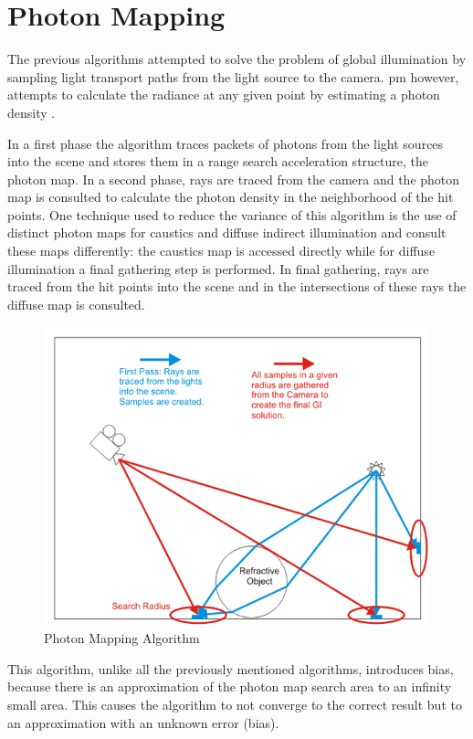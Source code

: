 \section{Photon Mapping}

The previous algorithms attempted to solve the problem of global illumination by sampling light transport paths from the light source to the camera. \gls{pm} however, attempts to calculate the radiance at any given point by estimating a photon density \citep{Jensen}.

In a first phase the algorithm traces packets of photons from the light sources into the scene and stores them in a range search acceleration structure, the photon map. In a second phase, rays are traced from the camera and the photon map is consulted to calculate the photon density in the neighborhood of the hit points. One technique used to reduce the variance of this algorithm is the use of distinct photon maps for caustics and diffuse indirect illumination and consult these maps differently: the caustics map is accessed directly while for diffuse illumination a final gathering step is performed. In final gathering, rays are traced from the hit points into the scene and in the intersections of these rays the diffuse map is consulted.

\begin{figure}[H]
\centering
\includegraphics[width=0.75\linewidth]{img/pmDiagram.png}
\caption{\label{img:pmdiag} Photon Mapping Algorithm}
\end{figure}

This algorithm, unlike all the previously mentioned algorithms, introduces bias, because there is an approximation of the photon map search area to an infinity small area. This causes the algorithm to not converge to the correct result but to an approximation with an unknown error (bias).

